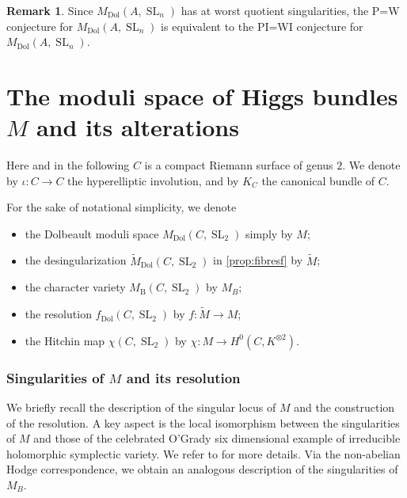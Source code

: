 \documentclass[JEP,XML,SOM,Unicode, NoEqCountersInSection,NoFloatCountersInSection,published]{cedram}
\theoremstyle{definition}
\newtheorem{rmk}[thm]{Remark}
\newcommand{\Sl}{\operatorname{SL}}
\newcommand{\MDolSlone}{{M}_{\mathrm{Dol}}(A, \Sl_n)}
\begin{document}
\begin{rmk}\label{PI=WIisP=Wgenusone}
Since $\MDolSlone$ has at worst quotient singularities, the P=W conjecture for $\MDolSlone$ is equivalent to the PI=WI conjecture for $\MDolSlone$.
\end{rmk}

\section{The moduli space of Higgs bundles \texorpdfstring{$M$}{M} and its alterations}\label{sec:preliminary}
Here and in the following $C$ is a compact Riemann surface of genus $2$. We denote by $\iota\colon C \to C$ the hyperelliptic involution, and by $K_C$ the canonical bundle of $C$.

For the sake of notational simplicity, we denote
\begin{itemize}
\item the Dolbeault moduli space ${M}_{\mathrm{Dol}}(C, \Sl_2)$ simply by $M$;
\item the desingularization $\widetilde{M}_{\mathrm{Dol}}(C, \Sl_2)$ in \cref{prop:fibresf} by $\widetilde{M}$;
\item the character variety ${M}_{\mathrm{B}}(C, \Sl_2)$ by $M_B$;
\item the resolution $f_{\mathrm{Dol}}(C, \Sl_2)$ by $f: \widetilde{M} \to M$;
\item the Hitchin map $\chi(C, \Sl_2)$ by $\chi\colon M \to H^0(C, K^{\otimes 2})$.
\end{itemize}

\subsubsection{Singularities of $M$ and its resolution}\label{sec:singularityresolution}
We briefly recall the description of the singular locus of $M$ and the construction of the resolution. A key aspect is the local isomorphism between the singularities of $M$ and those of the celebrated O'Grady six dimensional example of irreducible holomorphic symplectic variety. We refer to \cite{Felisetti2018} for more details.
Via the non-abelian Hodge correspondence, we obtain an analogous description of the singularities of $M_B$.
\end{document}
